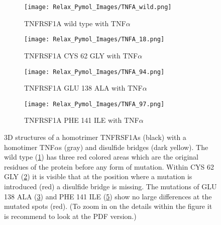 	\newpage
	
	\begin{figure}[!ht]
		\centering
		\begin{subfigure}{0.49\textwidth}
			\texttt{[image: Relax\_Pymol\_Images/TNFA\_wild.png]}
			\caption{TNFRSF1A wild type with TNF$\alpha$}
			\label{fig:RES_TNFA_wild}
		\end{subfigure}
		\begin{subfigure}{0.49\textwidth}
			\texttt{[image: Relax\_Pymol\_Images/TNFA\_18.png]}
			\caption{TNFRSF1A CYS 62 GLY with TNF$\alpha$}
			\label{fig:RES_TNFA_18}
		\end{subfigure}
		\par\bigskip
		\begin{subfigure}{0.49\textwidth}
			\texttt{[image: Relax\_Pymol\_Images/TNFA\_94.png]}
			\caption{TNFRSF1A GLU 138 ALA with TNF$\alpha$}
			\label{fig:RES_TNFA_94}
		\end{subfigure}
		\begin{subfigure}{0.49\textwidth}
			\texttt{[image: Relax\_Pymol\_Images/TNFA\_97.png]}
			\caption{TNFRSF1A PHE 141 ILE with TNF$\alpha$}
			\label{fig:RES_TNFA_97}
			\end{subfigure}
		\caption[TNFRSF1A homotrimer with TNF$\alpha$ homo trimers wild type and mutated relaxed models]{3D structures of a homotrimer TNFRSF1As (black) with a homotimer TNF$\alpha$s (gray) and disulfide bridges (dark yellow). The wild type (\ref{fig:RES_TNFA_wild}) has three red colored areas which are the original residues of the protein before any form of mutation. Within CYS 62 GLY (\ref{fig:RES_TNFA_18}) it is visible that at the position where a mutation is introduced (red) a disulfide bridge is missing. The mutations of GLU 138 ALA (\ref{fig:RES_TNFA_94}) and PHE 141 ILE (\ref{fig:RES_TNFA_97}) show no large differences at the mutated spots (red). (To zoom in on the details within the figure it is recommend to look at the PDF version.)}
		\end{figure}
		\newpage
		
